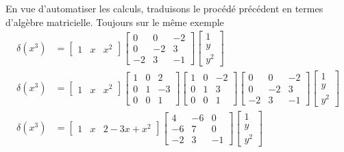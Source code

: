 \documentclass{standalone}
\begin{document}
En vue d'automatiser les calculs, traduisons le procédé précédent en termes d'algèbre matricielle.
Toujours sur le même exemple
\begin{align} \nonumber %
	\delta(x^3) &=
	\begin{bmatrix}
			1 & x & x^2
	\end{bmatrix}
	\begin{bmatrix}
		0 & 0 & -2 \\
		0 & -2 & 3 \\
		-2 & 3 & -1
	\end{bmatrix}
	\begin{bmatrix}
		1 \\
		y \\
		y^2
	\end{bmatrix} \\ \nonumber %
	\delta(x^3) &=
	\begin{bmatrix}
		1 & x & x^2
	\end{bmatrix}
	\begin{bmatrix}
		1 & 0 & 2 \\
		0 & 1 & -3 \\
		0 & 0 & 1
	\end{bmatrix}
	\begin{bmatrix}
		1 & 0 & -2 \\
		0 & 1 & 3 \\
		0 & 0 & 1
	\end{bmatrix}
	\begin{bmatrix}
		0 & 0 & -2 \\
		0 & -2 & 3 \\
		-2 & 3 & -1
	\end{bmatrix}
	\begin{bmatrix}
		1 \\
		y \\
		y^2
	\end{bmatrix} \\ \nonumber %
	\delta(x^3) &=
	\begin{bmatrix}
			1 & x & 2 - 3x + x^2
	\end{bmatrix}
	\begin{bmatrix}
		4 & -6 & 0 \\
		-6 & 7 & 0 \\
		-2 & 3 & -1
	\end{bmatrix}
	\begin{bmatrix}
		1 \\
		y \\
		y^2
	\end{bmatrix} \\ \nonumber %
\end{align}
\end{document}
